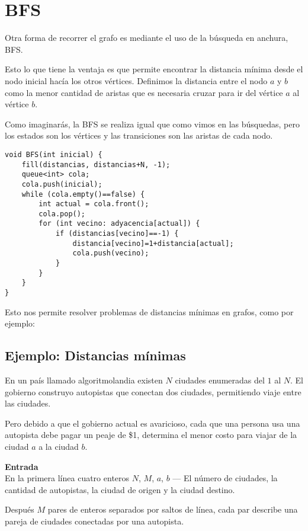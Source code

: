 \chapter{BFS}
Otra forma de recorrer el grafo es mediante el uso de la búsqueda en anchura, BFS. 

Esto lo que tiene la ventaja es que permite encontrar la distancia mínima desde el nodo inicial hacía los otros vértices. Definimos la distancia entre el nodo \(a\) y \(b\) como la menor cantidad de aristas que es necesaria cruzar para ir del vértice \(a\) al vértice \(b\).


Como imaginarás, la BFS se realiza igual que como vimos en las búsquedas, pero los estados son los vértices y las transiciones son las aristas de cada nodo. 

\begin{minipage}{\linewidth}
\begin{lstlisting}	
void BFS(int inicial) {
	fill(distancias, distancias+N, -1);
	queue<int> cola;
	cola.push(inicial);
	while (cola.empty()==false) {
		int actual = cola.front();
		cola.pop();
		for (int vecino: adyacencia[actual]) {
			if (distancias[vecino]==-1) {
				distancia[vecino]=1+distancia[actual];
				cola.push(vecino);
			}
		}
	}
}
\end{lstlisting}
\end{minipage}

Esto nos permite resolver problemas de distancias mínimas en grafos, como por ejemplo:

\section*{Ejemplo: Distancias mínimas}
En un país llamado algoritmolandia existen \(N\) ciudades enumeradas del \(1\) al \(N\). El gobierno construyo autopistas que conectan dos ciudades, permitiendo viaje entre las ciudades.

Pero debido a que el gobierno actual es avaricioso, cada que una persona usa una autopista debe pagar un peaje de \$1, determina el menor costo para viajar de la ciudad \(a\) a la ciudad \(b\).

\textbf{Entrada}\\
En la primera línea cuatro enteros \(N\), \(M\), \(a\), \(b\) --- El número de ciudades, la cantidad de autopistas, la ciudad de origen y la ciudad destino.

Después \(M\) pares de enteros separados por saltos de línea, cada par describe una pareja de ciudades conectadas por una autopista.

